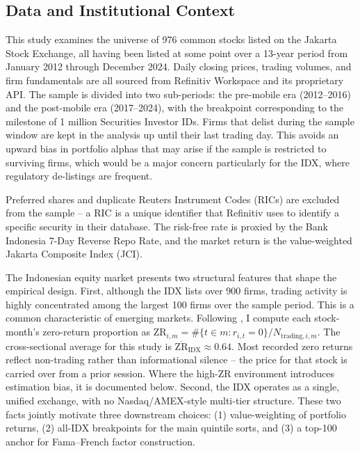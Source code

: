 \documentclass[
	a4paper,
	10pt,
	twoside,
]{LTJournalArticle}
\begin{document}
\subsection{Data and Institutional Context}

This study examines the universe of 976 common stocks listed on the Jakarta Stock Exchange, all having been listed at some point over a 13-year period from January 2012 through December 2024. Daily closing prices, trading volumes, and firm fundamentals are all sourced from Refinitiv Workspace and its proprietary API. The sample is divided into two sub-periods: the pre-mobile era (2012--2016) and the post-mobile era (2017--2024), with the breakpoint corresponding to the milestone of 1 million Securities Investor IDs. Firms that delist during the sample window are kept in the analysis up until their last trading day. This avoids an upward bias in portfolio alphas that may arise if the sample is restricted to surviving firms, which would be a major concern particularly for the IDX, where regulatory de-listings are frequent. 

Preferred shares and duplicate Reuters Instrument Codes (RICs) are excluded from the sample -- a RIC is a unique identifier that Refinitiv uses to identify a specific security in their database. The risk-free rate is proxied by the Bank Indonesia 7-Day Reverse Repo Rate, and the market return is the value-weighted Jakarta Composite Index (JCI).

The Indonesian equity market presents two structural features that shape the empirical design. First, although the IDX lists over 900 firms, trading activity is highly concentrated among the largest 100 firms over the sample period. This is a common characteristic of emerging markets. Following \citet{bekaert2005}, I compute each stock-month's zero-return proportion as $\text{ZR}_{i,m} = \#\{t \in m : r_{i,t} = 0\} / N_{\text{trading},i,m}$. The cross-sectional average for this study is $\overline{\text{ZR}}_{\text{IDX}} \approx 0.64$. Most recorded zero returns reflect non-trading rather than informational silence -- the price for that stock is carried over from a prior session. Where the high-ZR environment introduces estimation bias, it is documented below. Second, the IDX operates as a single, unified exchange, with no Nasdaq/AMEX-style multi-tier structure. These two facts jointly motivate three downstream choices: (1) value-weighting of portfolio returns, (2) all-IDX breakpoints for the main quintile sorts, and (3) a top-100 anchor for Fama--French factor construction.
\end{document}
